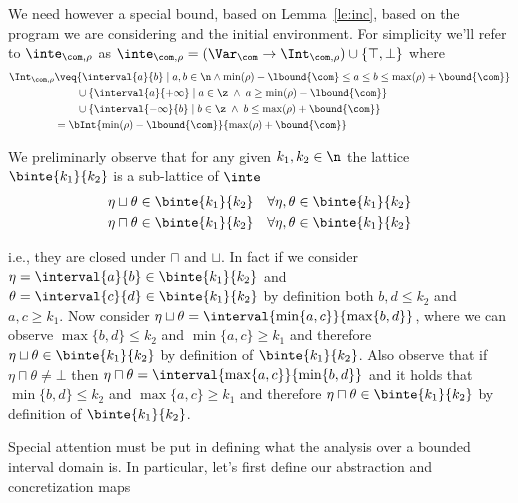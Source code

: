 %
We need however a special bound, based on Lemma~\ref{le:inc}, based on
the program we are considering and the initial environment.  For
simplicity we'll refer to \(\inte_{\com,\rho}\) as
\({\inte_{\com,\rho} = (\Var_{\com} \to \Int_{\com,\rho}) \cup \{
  \top, \bot \}}\) where
\begin{align*}
  \Int_{\com,\rho} & \veq \{ \interval{a}{b} \mid a, b \in \n \land
                     \min(\rho) - \lbound{\com} \leq a \leq b \leq \max(\rho) + \bound{\com}\} \\
                   & \phantom{\veq} \cup \{\interval{a}{+\infty} \mid a \in\z \; \land \; a \geq \min(\rho) - \lbound{\com}\} \\
                   & \phantom{\veq} \cup \{\interval{-\infty}{b} \mid b \in\z \; \land \; b \leq \max(\rho) + \bound{\com}\} \\
                   & = \bInt{\min(\rho)-\lbound{\com}}{\max(\rho) + \bound{\com}}
\end{align*}

We preliminarly observe that for any given \(k_1,k_2\in\n\) the
lattice \(\binte{k_1}{k_2}\) is a sub-lattice of \(\inte\)
\begin{align*}
  \eta \sqcup \theta & \in \binte{k_1}{k_2} & \forall \eta,\theta \in \binte{k_1}{k_2} \\
  \eta \sqcap \theta & \in \binte{k_1}{k_2} & \forall \eta,\theta \in \binte{k_1}{k_2}
\end{align*}

i.e., they are closed under \(\sqcap\) and \(\sqcup\). In fact if we
consider \({\eta = \interval{a}{b} \in \binte{k_1}{k_2}}\) and
\({\theta = \interval{c}{d} \in \binte{k_1}{k_2}}\) by definition both
\(b,d \leq k_2\) and \(a,c \geq k_1\). Now consider
\({\eta \sqcup \theta = \interval{\min\{a,c\}}{\max\{b,d\}}}\), where
we can observe \(\max\{b,d\} \leq k_2\) and \(\min\{a,c\} \geq k_1\)
and therefore \({\eta \sqcup \theta \in \binte{k_1}{k_2}}\) by
definition of \(\binte{k_1}{k_2}\).  Also observe that if
\(\eta \sqcap \theta \neq \bot\) then
\({\eta \sqcap \theta = \interval{\max\{a,c\}}{\min\{b,d\}}}\) and it
holds that \({\min\{b,d\} \leq k_2}\) and \({\max\{a,c\} \geq k_1}\)
and therefore \({\eta \sqcap \theta \in \binte{k_1}{k_2}}\) by definition of
\(\binte{k_1}{k_2}\).

\medskip

\noindent
Special attention must be put in defining what the analysis over a
bounded interval domain is. In particular, let's first define our
abstraction and concretization maps

